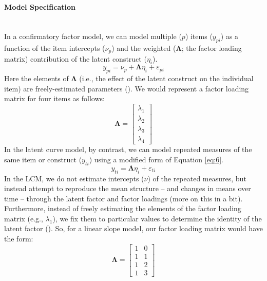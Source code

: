 \documentclass[11pt]{article}
\newcommand{\subsubsubsection}[1]{\paragraph{#1}\mbox{}\\}  %
\begin{document}
\subsubsubsection{Model Specification}
In a confirmatory factor model, we can model multiple ($p$) items ($y_{pi}$) as a function of the item intercepts ($\nu_{p}$) and the weighted ($\mathbf{\Lambda}$; the factor loading matrix) contribution of the latent construct ($\eta_{i}$).
%
\begin{equation} \label{eq:6}
y_{pi} = \nu_{p} + \mathbf{\Lambda}\eta_{i} + \varepsilon_{pi}
\end{equation}
%
Here the elements of $\mathbf{\Lambda}$ (i.e., the effect of the latent construct on the individual item) are freely-estimated parameters (\cite{bollen_structural_1989}). We would represent a factor loading matrix for four items as follows:
%
\begin{equation} \label{eq:7}
\mathbf{\Lambda} = \left[ \begin{array}{c} \lambda_{1} \\ \lambda_{2} \\ \lambda_{3} \\ \lambda_{4} \end{array} \right]
\end{equation}
%
In the latent curve model, by contrast, we can model repeated measures of the same item or construct ($y_{ti}$) using a modified form of Equation \ref{eq:6}.
%
\begin{equation} \label{eq:8}
y_{ti} = \mathbf{\Lambda}\eta_{i} + \varepsilon_{ti}
\end{equation}
%
In the LCM, we do not estimate intercepts ($\nu$) of the repeated measures, but instead attempt to reproduce the mean structure -- and changes in means over time -- through the latent factor and factor loadings (more on this in a bit). Furthermore, instead of freely estimating the elements of the factor loading matrix (e.g., $\lambda_{1}$), we fix them to particular values to determine the identity of the latent factor (\cite{meredith_latent_1990}). So, for a linear slope model, our factor loading matrix would have the form:
%
\begin{equation} \label{eq:9}
\mathbf{\Lambda} = \left[ \begin{array}{cc} 1 & 0 \\ 1 & 1 \\ 1 & 2 \\ 1 & 3  \end{array} \right]
\end{equation}
%
\end{document}
